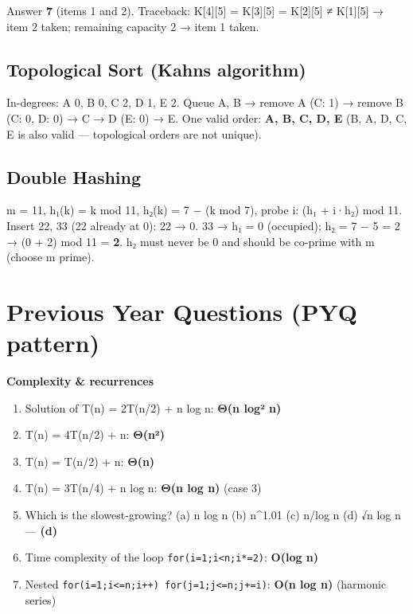 \endgroup

Answer \textbf{7} (items 1 and 2). Traceback: K{[}4{]}{[}5{]} = K{[}3{]}{[}5{]} = K{[}2{]}{[}5{]} ≠ K{[}1{]}{[}5{]} → item 2 taken; remaining capacity 2 → item 1 taken.

\needspace{95pt}

\hypertarget{p2-07--137-topological-sort-kahns-algorithm}{%
\subsection{Topological Sort (Kahn\textquotesingle s algorithm)}\label{p2-07--137-topological-sort-kahns-algorithm}}



In-degrees: A 0, B 0, C 2, D 1, E 2. Queue A, B → remove A (C: 1) → remove B (C: 0, D: 0) → C → D (E: 0) → E.
One valid order: \textbf{A, B, C, D, E} (B, A, D, C, E is also valid --- topological orders are not unique).

\needspace{191pt}

\hypertarget{p2-07--138-double-hashing}{%
\subsection{Double Hashing}\label{p2-07--138-double-hashing}}

m = 11, h₁(k) = k mod 11, h₂(k) = 7 − (k mod 7), probe i: (h₁ + i·h₂) mod 11. Insert 22, 33 (22 already at 0):
22 → 0. 33 → h₁ = 0 (occupied); h₂ = 7 − 5 = 2 → (0 + 2) mod 11 = \textbf{2}.
h₂ must never be 0 and should be co-prime with m (choose m prime).

\needspace{125pt}

\hypertarget{p2-07--previous-year-questions-pyq-pattern}{%
\section{Previous Year Questions (PYQ pattern)}\label{p2-07--previous-year-questions-pyq-pattern}}

\textbf{Complexity \& recurrences}

\begin{enumerate}
\def\labelenumi{\arabic{enumi}.}
\tightlist
\item
  Solution of T(n) = 2T(n/2) + n log n: \textbf{Θ(n log² n)}
\item
  T(n) = 4T(n/2) + n: \textbf{Θ(n²)}
\item
  T(n) = T(n/2) + n: \textbf{Θ(n)}
\item
  T(n) = 3T(n/4) + n log n: \textbf{Θ(n log n)} (case 3)
\item
  Which is the slowest-growing? (a) n log n (b) n\^{}1.01 (c) n/log n (d) √n log n --- \textbf{(d)}
\item
  Time complexity of the loop \texttt{for(i=1;i\textless{}n;i*=2)}: \textbf{O(log n)}
\item
  Nested \texttt{for(i=1;i\textless{}=n;i++)\ for(j=1;j\textless{}=n;j+=i)}: \textbf{O(n log n)} (harmonic series)
\end{enumerate}

